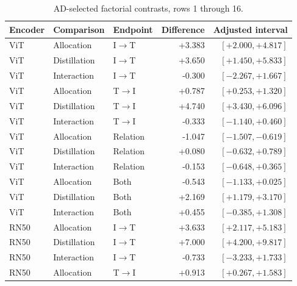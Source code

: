 \begin{table}[t]
\centering
\small
\setlength{\tabcolsep}{3pt}
\begin{tabular}{lllrr}
\toprule
Encoder & Comparison & Endpoint & Difference & Adjusted interval\\
\midrule
ViT & Allocation & I$\to$T & +3.383 & $[+2.000,+4.817]$ \\
ViT & Distillation & I$\to$T & +3.650 & $[+1.450,+5.833]$ \\
ViT & Interaction & I$\to$T & -0.300 & $[-2.267,+1.667]$ \\
ViT & Allocation & T$\to$I & +0.787 & $[+0.253,+1.320]$ \\
ViT & Distillation & T$\to$I & +4.740 & $[+3.430,+6.096]$ \\
ViT & Interaction & T$\to$I & -0.333 & $[-1.140,+0.460]$ \\
ViT & Allocation & Relation & -1.047 & $[-1.507,-0.619]$ \\
ViT & Distillation & Relation & +0.080 & $[-0.632,+0.789]$ \\
ViT & Interaction & Relation & -0.153 & $[-0.648,+0.365]$ \\
ViT & Allocation & Both & -0.543 & $[-1.133,+0.025]$ \\
ViT & Distillation & Both & +2.169 & $[+1.179,+3.170]$ \\
ViT & Interaction & Both & +0.455 & $[-0.385,+1.308]$ \\
RN50 & Allocation & I$\to$T & +3.633 & $[+2.117,+5.183]$ \\
RN50 & Distillation & I$\to$T & +7.000 & $[+4.200,+9.817]$ \\
RN50 & Interaction & I$\to$T & -0.733 & $[-3.233,+1.733]$ \\
RN50 & Allocation & T$\to$I & +0.913 & $[+0.267,+1.583]$ \\
\bottomrule
\end{tabular}
\caption{AD-selected factorial contrasts, rows 1 through 16.}\label{tab:adfactorial0}
\end{table}



